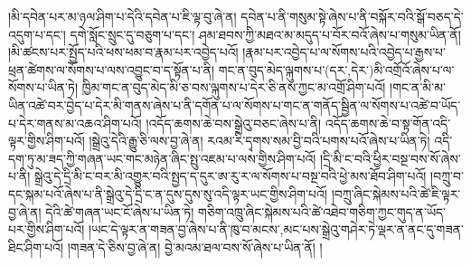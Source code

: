 །མི་དབེན་པར་མ་ཉལ་ཤིག་པ་དེའི་དབེན་པ་ཇི་ལྟ་བུ་ཞེ་ན། དབེན་པ་ནི་གསུམ་སྟེ་ཞེས་པ་ནི་བསྐོར་བའི་སྒོ་བཅད་དེ་འདུག་པ་དང་། དགེ་སློང་སྲུང་དུ་བཅུག་པ་དང་། ཤམ་ཐབས་ཀྱི་མཐའ་མ་མདུད་པ་བོར་བའོ་ཞེས་པ་གསུམ་ཡིན་ནོ། །མི་ཚངས་པར་སྤྱོད་པའི་ཕས་ཕམ་བ་རྣམ་པར་འབྱེད་པའོ། །རྣམ་པར་འབྱེད་པ་ལ་སོགས་པའི་འབྱེད་པ་རྒྱས་པ་ཕྲན་ཚེགས་ལ་སོགས་པ་ལས་འབྱུང་བ་ད་སྟོན་པ་ནི། གང་ན་བུད་མེད་ལྐུགས་པ་(དར་‚དེར་)མི་འགྲོའོ་ཞེས་པ་ལ་སོགས་པ་ཡིན་ཏེ། ཁྱིམ་གང་ན་བུད་མེད་མི་ཅ་བས་ལྐུགས་པ་དེར་ཅི་ནས་ཀྱང་མ་འགྲོ་ཤིག་པའོ། །གང་ན་མི་མ་ཡིན་འཚེ་བར་བྱེད་པ་དེར་མི་གནས་ཞེས་པ་ནི་དགོན་པ་ལ་སོགས་པ་གང་ན་གནོད་སྦྱིན་ལ་སོགས་པ་འཚེ་བ་ཡོད་པ་དེར་གནས་མ་འཆའ་ཤིག་པའོ། །འདོད་ཆགས་ཆེ་བས་སྒྲེའུ་བཅང་ཞེས་པ་ནི། འདོད་ཆགས་ཆེ་བ་སྟ་གོན་འདི་ལྟར་གྱིས་ཤིག་པའོ། །སྒྲེའུ་དེའི་རྒྱུ་ཅི་ལས་བྱ་ཞེ་ན། རའམ་རི་དྭགས་སམ་བྱི་བའི་པགས་པའོ་ཞེས་པ་ཡིན་ཏེ། འདི་དག་ཏུ་མ་ཟད་ཀྱི་གཞན་ཡང་གང་མཉེན་ཞིང་སྤུ་འཇམ་པ་ལས་གྱིས་ཤིག་པའོ། །དྲི་མི་ང་བའི་ཕྱིར་བསྔ་བས་སོ་ཞེས་པ་ནི། སྒྲེའུ་དེ་དྲི་མི་ང་བར་མི་འགྱུར་བའི་སྤྱད་ད་དུར་ཨ་རུ་ར་ལ་སོགས་པ་བསྔ་བའི་ཕྱེ་མས་ཐོབ་ཤིག་པའོ། །བཀྲུ་བ་དང་སྐམ་པའོ་ཞེས་པ་ནི་སྒྲེའུ་དེ་དྲི་ང་ན་དུས་དུས་སུ་འདི་ལྟར་ཡང་གྱིས་ཤིག་པའོ། །བཀྲུ་ཞིང་སྐེམས་པའི་ཚེ་ཇི་ལྟར་བྱ་ཞེ་ན། དེའི་ཚེ་གཞན་ཡང་ངོ་ཞེས་པ་ཡིན་ཏེ། གཅིག་འཁྲུ་ཞིང་སྐེམས་པའི་ཚེ་འཐེབ་གཅིག་ཀྱང་གུད་ན་ཡོད་པར་གྱིས་ཤིག་པའོ། །ཡང་དེ་ལྟར་ན་གཟན་བྱ་ཞེས་པ་ནི་ཁུ་བ་{མངས་,མང་}པས་སྒྲེའུ་གཤེར་ཏེ་ལྡར་ན་ནང་དུ་གཟན་ཐིང་ཤིག་པའོ། །གཟན་དེ་ཅིས་བྱ་ཞེ་ན། བྱེ་མའམ་ཐལ་བས་སོ་ཞེས་པ་ཡིན་ནོ། །
